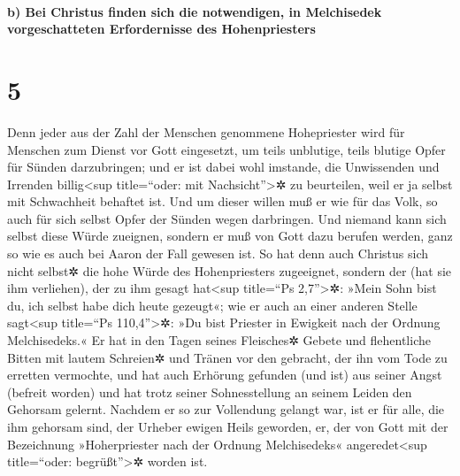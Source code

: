 \hypertarget{b-bei-christus-finden-sich-die-notwendigen-in-melchisedek-vorgeschatteten-erfordernisse-des-hohenpriesters}{%
\paragraph{b) Bei Christus finden sich die notwendigen, in Melchisedek
vorgeschatteten Erfordernisse des
Hohenpriesters}\label{b-bei-christus-finden-sich-die-notwendigen-in-melchisedek-vorgeschatteten-erfordernisse-des-hohenpriesters}}

\hypertarget{section-4}{%
\section{5}\label{section-4}}

 Denn jeder aus der Zahl der Menschen genommene
Hohepriester wird für Menschen zum Dienst vor Gott eingesetzt, um teils
unblutige, teils blutige Opfer für Sünden darzubringen; 
und er ist dabei wohl imstande, die Unwissenden und Irrenden
billig\textless sup title=``oder: mit Nachsicht''\textgreater✲ zu
beurteilen, weil er ja selbst mit Schwachheit behaftet ist.
 Und um dieser willen muß er wie für das Volk, so auch für
sich selbst Opfer der Sünden wegen darbringen.  Und
niemand kann sich selbst diese Würde zueignen, sondern er muß von Gott
dazu berufen werden, ganz so wie es auch bei Aaron der Fall gewesen ist.
 So hat denn auch Christus sich nicht selbst✲ die hohe
Würde des Hohenpriesters zugeeignet, sondern der (hat sie ihm
verliehen), der zu ihm gesagt hat\textless sup title=``Ps
2,7''\textgreater✲: »Mein Sohn bist du, ich selbst habe dich heute
gezeugt«;  wie er auch an einer anderen Stelle
sagt\textless sup title=``Ps 110,4''\textgreater✲: »Du bist Priester in
Ewigkeit nach der Ordnung Melchisedeks.«  Er hat in den
Tagen seines Fleisches✲ Gebete und flehentliche Bitten mit lautem
Schreien✲ und Tränen vor den gebracht, der ihn vom Tode zu erretten
vermochte, und hat auch Erhörung gefunden (und ist) aus seiner Angst
(befreit worden)  und hat trotz seiner Sohnesstellung an
seinem Leiden den Gehorsam gelernt.  Nachdem er so zur
Vollendung gelangt war, ist er für alle, die ihm gehorsam sind, der
Urheber ewigen Heils geworden,  er, der von Gott mit der
Bezeichnung »Hoherpriester nach der Ordnung Melchisedeks«
angeredet\textless sup title=``oder: begrüßt''\textgreater✲ worden ist.

